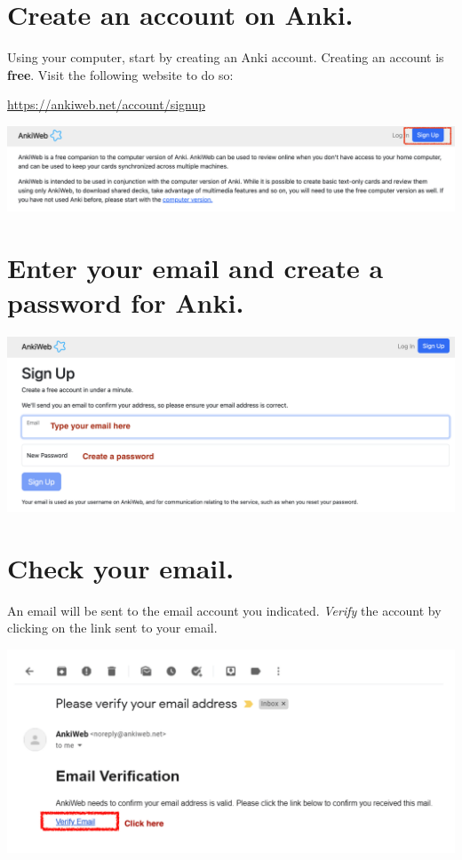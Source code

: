 \documentclass[
]{book}
\begin{document}
\section{Create an account on Anki.}\label{create-an-account-on-anki.}

Using your computer, start by creating an Anki account. Creating an account is \textbf{free}. Visit the following website to do so:

\url{https://ankiweb.net/account/signup}

\includegraphics[width=0.9\linewidth]{images/reposit_en/sign_up}

\section{Enter your email and create a password for Anki.}\label{cross_3}

\includegraphics[width=0.9\linewidth]{images/reposit_en/email_password}

\section{Check your email.}\label{check-your-email.}

An email will be sent to the email account you indicated. \emph{Verify} the account by clicking on the link sent to your email.

\includegraphics[width=0.9\linewidth]{images/reposit_en/email_verification}
\end{document}
